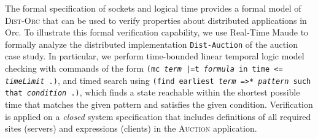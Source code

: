 \documentclass{eptcs}
\begin{document}
The formal specification of sockets and logical time provides a formal model of \textsc{Dist-Orc} that can be used to verify properties about distributed applications in Orc. To illustrate this formal verification capability, we use Real-Time Maude to formally analyze the distributed implementation  \texttt{Dist-Auction} of the auction case study. In particular, we perform time-bounded linear temporal logic model checking with commands of the form \texttt{(mc \emph{term} |=t \emph{formula} in time <= \emph{timeLimit} .)}, and timed search using \texttt{(find earliest \emph{term} =>* \emph{pattern} such that \emph{condition} .)}, which finds a state reachable within the shortest possible time that matches the given pattern and satisfies the given condition.
Verification is applied on a \emph{closed} system specification that includes definitions of all required sites (servers) and expressions (clients) in the \textsc{Auction} application.
\end{document}
